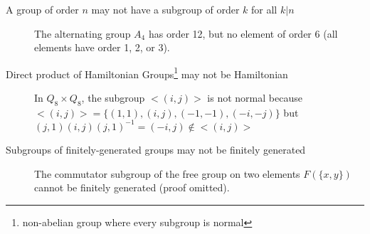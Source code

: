 \documentclass[]{article}
\newcommand{\x}{\times}
\begin{document}
\begin{description}
\item[A group of order $n$ may not have a subgroup of order $k$ for all $k | n$]
The alternating group $A_4$ has order 12, but no element of order 6 (all
elements have order 1, 2, or 3).

\item[Direct product of Hamiltonian Groups\footnote{non-abelian group where
every subgroup is normal} may not be Hamiltonian]
In $Q_8 \x Q_8$, the subgroup $<(i, j)>$ is not normal because $<(i, j)> = \{(1,
1), (i, j), (-1, -1), (-i, -j) \}$ but $(j, 1)(i, j)(j, 1)^{-1} = (-i, j)
\not\in <(i, j)>$

\item[Subgroups of finitely-generated groups may not be finitely generated]
The commutator subgroup of the free group on two elements $F(\{x, y\})$ cannot
be finitely generated (proof omitted).

\end{description}
\end{document}
